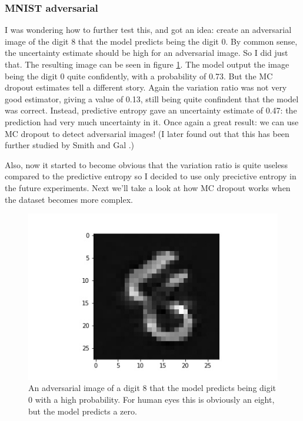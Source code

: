 \documentclass[11pt]{article}
\begin{document}
\subsubsection{MNIST adversarial}

I was wondering how to further test this, and got an idea: create an adversarial image of the digit 8 that the model predicts being the digit 0. By common sense, the uncertainty estimate should be high for an adversarial image. So I did just that. The resulting image can be seen in figure \ref{fig:zero-adversarial}. The model output the image being the digit 0 quite confidently, with a probability of 0.73. But the MC dropout estimates tell a different story. Again the variation ratio was not very good estimator, giving a value of 0.13, still being quite confindent that the model was correct. Instead, predictive entropy gave an uncertainty estimate of 0.47: the prediction had very much uncertainty in it. Once again a great result: we can use MC dropout to detect adversarial images! (I later found out that this has been further studied by Smith and Gal \cite{smith2018understanding}.)

Also, now it started to become obvious that the variation ratio is quite useless compared to the predictive entropy so I decided to use only precictive entropy in the future experiments. Next we'll take a look at how MC dropout works when the dataset becomes more complex.

\begin{figure}
    \center
    \includegraphics[scale=0.5]{images/zero-adversarial}
    \caption{An adversarial image of a digit 8 that the model predicts being digit 0 with a high probability. For human eyes this is obviously an eight, but the model predicts a zero.}
    \label{fig:zero-adversarial}
\end{figure}
\end{document}
